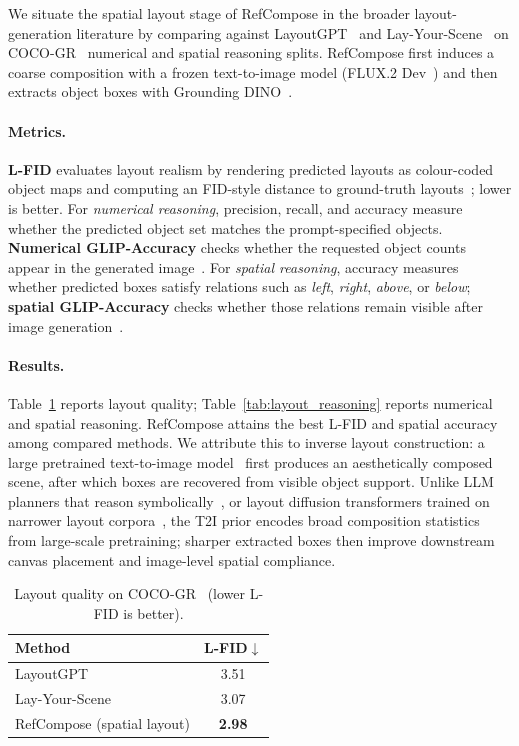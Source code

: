 \documentclass[runningheads]{llncs}
\begin{document}
We situate the spatial layout stage of RefCompose in the broader layout-generation literature by comparing against LayoutGPT~\cite{feng2023layoutgpt} and Lay-Your-Scene~\cite{srivastava2025layyourscene} on COCO-GR~\cite{feng2023layoutgpt} numerical and spatial reasoning splits.
RefCompose first induces a coarse composition with a frozen text-to-image model (FLUX.2 Dev~\cite{blackforestlabs2026flux2dev}) and then extracts object boxes with Grounding DINO~\cite{liu2023grounding}.

\paragraph{Metrics.}
\textbf{L-FID} evaluates layout realism by rendering predicted layouts as colour-coded object maps and computing an FID-style distance to ground-truth layouts~\cite{heusel2017fid}; lower is better.
For \emph{numerical reasoning}, precision, recall, and accuracy measure whether the predicted object set matches the prompt-specified objects.
\textbf{Numerical GLIP-Accuracy} checks whether the requested object counts appear in the generated image~\cite{li2022glip}.
For \emph{spatial reasoning}, accuracy measures whether predicted boxes satisfy relations such as \emph{left}, \emph{right}, \emph{above}, or \emph{below}; \textbf{spatial GLIP-Accuracy} checks whether those relations remain visible after image generation~\cite{li2022glip}.

\paragraph{Results.}
Table~\ref{tab:layout_lfid} reports layout quality; Table~\ref{tab:layout_reasoning} reports numerical and spatial reasoning.
RefCompose attains the best L-FID and spatial accuracy among compared methods.
We attribute this to inverse layout construction: a large pretrained text-to-image model~\cite{blackforestlabs2026flux2dev} first produces an aesthetically composed scene, after which boxes are recovered from visible object support.
Unlike LLM planners that reason symbolically~\cite{feng2023layoutgpt}, or layout diffusion transformers trained on narrower layout corpora~\cite{srivastava2025layyourscene}, the T2I prior encodes broad composition statistics from large-scale pretraining; sharper extracted boxes then improve downstream canvas placement and image-level spatial compliance.

\begin{table}[t]
  \centering
  \caption{Layout quality on COCO-GR~\cite{feng2023layoutgpt} (lower L-FID is better).}
  \label{tab:layout_lfid}
  \setlength{\tabcolsep}{8pt}
  \begin{tabular}{lc}
    \toprule
    \textbf{Method} & \textbf{L-FID}$\downarrow$ \\
    \midrule
    LayoutGPT~\cite{feng2023layoutgpt} & 3.51 \\
    Lay-Your-Scene~\cite{srivastava2025layyourscene} & 3.07 \\
    RefCompose (spatial layout) & \textbf{2.98} \\
    \bottomrule
  \end{tabular}
\end{table}
\end{document}
